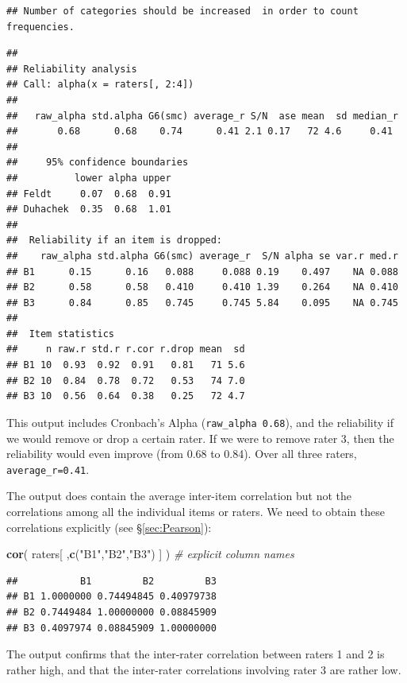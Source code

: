 \documentclass[
]{book}
\newenvironment{Shaded}{\begin{snugshade}}{\end{snugshade}}
\newcommand{\CommentTok}[1]{\textcolor[rgb]{0.56,0.35,0.01}{\textit{#1}}}
\newcommand{\FunctionTok}[1]{\textcolor[rgb]{0.13,0.29,0.53}{\textbf{#1}}}
\newcommand{\NormalTok}[1]{#1}
\newcommand{\StringTok}[1]{\textcolor[rgb]{0.31,0.60,0.02}{#1}}
\begin{document}
\begin{verbatim}
## Number of categories should be increased  in order to count frequencies.
\end{verbatim}

\begin{verbatim}
## 
## Reliability analysis   
## Call: alpha(x = raters[, 2:4])
## 
##   raw_alpha std.alpha G6(smc) average_r S/N  ase mean  sd median_r
##       0.68      0.68    0.74      0.41 2.1 0.17   72 4.6     0.41
## 
##     95% confidence boundaries 
##          lower alpha upper
## Feldt     0.07  0.68  0.91
## Duhachek  0.35  0.68  1.01
## 
##  Reliability if an item is dropped:
##    raw_alpha std.alpha G6(smc) average_r  S/N alpha se var.r med.r
## B1      0.15      0.16   0.088     0.088 0.19    0.497    NA 0.088
## B2      0.58      0.58   0.410     0.410 1.39    0.264    NA 0.410
## B3      0.84      0.85   0.745     0.745 5.84    0.095    NA 0.745
## 
##  Item statistics 
##     n raw.r std.r r.cor r.drop mean  sd
## B1 10  0.93  0.92  0.91   0.81   71 5.6
## B2 10  0.84  0.78  0.72   0.53   74 7.0
## B3 10  0.56  0.64  0.38   0.25   72 4.7
\end{verbatim}

This output includes Cronbach's Alpha (\texttt{raw\_alpha\ 0.68}), and the
reliability if we would remove or drop a certain rater.
If we were to remove rater 3, then the reliability would even
improve (from 0.68 to 0.84). Over all three raters,
\texttt{average\_r=0.41}.

The output does contain the average inter-item correlation but not the correlations among all the individual items or raters.
We need to obtain these correlations explicitly (see §\ref{sec:Pearson}):

\begin{Shaded}
\begin{Highlighting}[]
\FunctionTok{cor}\NormalTok{( raters[ ,}\FunctionTok{c}\NormalTok{(}\StringTok{"B1"}\NormalTok{,}\StringTok{"B2"}\NormalTok{,}\StringTok{"B3"}\NormalTok{) ] ) }\CommentTok{\# explicit column names}
\end{Highlighting}
\end{Shaded}

\begin{verbatim}
##           B1         B2         B3
## B1 1.0000000 0.74494845 0.40979738
## B2 0.7449484 1.00000000 0.08845909
## B3 0.4097974 0.08845909 1.00000000
\end{verbatim}

The output confirms that the inter-rater correlation between raters 1 and 2 is rather high, and that the inter-rater correlations involving rater 3 are rather low.
\end{document}
